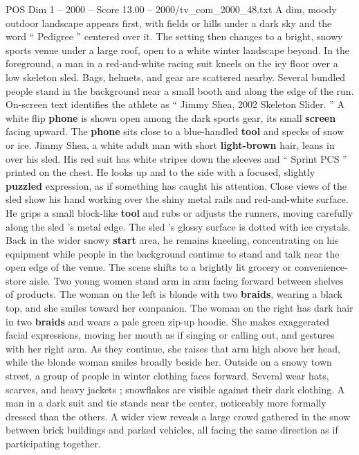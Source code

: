 \begin{textsample}{POS Dim 1 – 2000 – Score 13.00 – 2000/tv\_com\_2000\_48.txt}  \label{ex:f1_pos_037}
A dim, moody outdoor landscape appears first, with fields or hills under a dark sky and the word “ Pedigree ” centered over it.
The setting then changes to a bright, snowy sports venue under a large roof, open to a white winter landscape beyond.
In the foreground, a man in a red-and-white racing suit kneels on the icy floor over a low skeleton sled.
Bags, helmets, and gear are scattered nearby.
Several bundled people stand in the background near a small booth and along the edge of the run.
On-screen text identifies the athlete as “ Jimmy Shea, 2002 Skeleton Slider. ” A white flip \textbf{phone} is shown open among the dark sports gear, its small \textbf{screen} facing upward.
The \textbf{phone} sits close to a blue-handled \textbf{tool} and specks of snow or ice.
Jimmy Shea, a white adult man with short \textbf{light-brown} hair, leans in over his sled.
His red suit has white stripes down the sleeves and “ Sprint PCS ” printed on the chest.
He looks up and to the side with a focused, slightly \textbf{puzzled} expression, as if something has caught his attention.
Close views of the sled show his hand working over the shiny metal rails and red-and-white surface.
He grips a small block-like \textbf{tool} and rubs or adjusts the runners, moving carefully along the sled ’s metal edge.
The sled ’s glossy surface is dotted with ice crystals.
Back in the wider snowy \textbf{start} area, he remains kneeling, concentrating on his equipment while people in the background continue to stand and talk near the open edge of the venue.
The scene shifts to a brightly lit grocery or convenience-store aisle.
Two young women stand arm in arm facing forward between shelves of products.
The woman on the left is blonde with two \textbf{braids}, wearing a black top, and she smiles toward her companion.
The woman on the right has dark hair in two \textbf{braids} and wears a pale green zip-up hoodie.
She makes exaggerated facial expressions, moving her mouth as if singing or calling out, and gestures with her right arm.
As they continue, she raises that arm high above her head, while the blonde woman smiles broadly beside her.
Outside on a snowy town street, a group of people in winter clothing faces forward.
Several wear hats, scarves, and heavy jackets ; snowflakes are visible against their dark clothing.
A man in a dark suit and tie stands near the center, noticeably more formally dressed than the others.
A wider view reveals a large crowd gathered in the snow between brick buildings and parked vehicles, all facing the same direction as if participating together.

\end{textsample}
